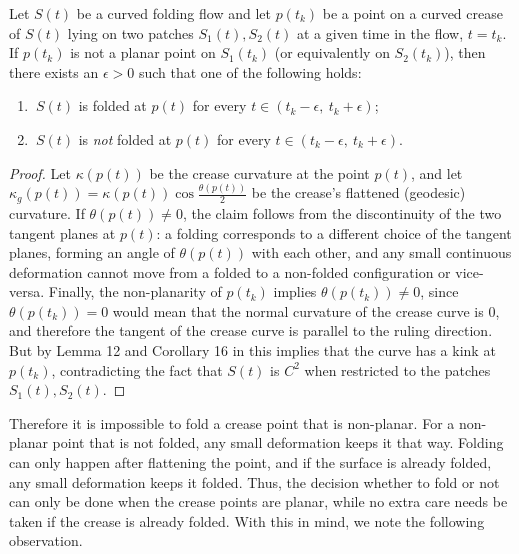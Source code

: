 \begin{theorem}\label{Thm:curved_folding_open_condition}
Let $S(t)$ be a curved folding flow and let $p(t_k)$ be a point on a curved crease of $S(t)$ lying on two patches $S_1(t),S_2(t)$ at a given time in the flow, $t=t_k$. If $p(t_k)$ is not a planar point on $S_1(t_k)$ (or equivalently on $S_2(t_k)$), then there exists an $\epsilon > 0$ such that one of the following holds:
\begin{enumerate}
	\item $\ S(t)$ is folded at $p(t)$ for every $t \in (t_k-\epsilon, \ t_k+\epsilon)$;
	\item $\ S(t)$ is \emph{not} folded at $p(t)$ for every $t \in (t_k-\epsilon, \ t_k+\epsilon)$.
\end{enumerate}
\end{theorem}
\begin{proof}
Let $\kappa(p(t))$ be the crease curvature at the point $p(t)$, and let $\kappa_g(p(t)) = \kappa(p(t))\cos\frac{\theta(p(t))}{2}$ be the crease's flattened (geodesic) curvature. If $\theta(p(t)) \neq 0$, the claim follows from the discontinuity of the two tangent planes at $p(t)$: a folding corresponds to a different choice of the tangent planes, forming an angle of $\theta(p(t))$ with each other, and any small continuous deformation cannot move from a folded to a non-folded configuration or vice-versa. Finally, the non-planarity of $p(t_k)$ implies $\theta(p(t_k)) \neq 0$, since $\theta(p(t_k)) = 0$ would mean that the normal curvature of the crease curve is $0$, and therefore the tangent of the crease curve is parallel to the ruling direction.
But by Lemma 12 and Corollary 16 in \cite{demaine_lens} this implies that the curve has a kink at  $p(t_k)$, contradicting the fact that $S(t)$ is $C^2$ when restricted to the patches $S_1(t), S_2(t)$.
\end{proof}

Therefore it is impossible to fold a crease point that is non-planar. For a non-planar point that is not folded, any small deformation keeps it that way. Folding can only happen after flattening the point, and if the surface is already folded, any small deformation keeps it folded. Thus, the decision whether to fold or not can only be done when the crease points are planar, while no extra care needs be taken if the crease is already folded. With this in mind, we note the following observation.

